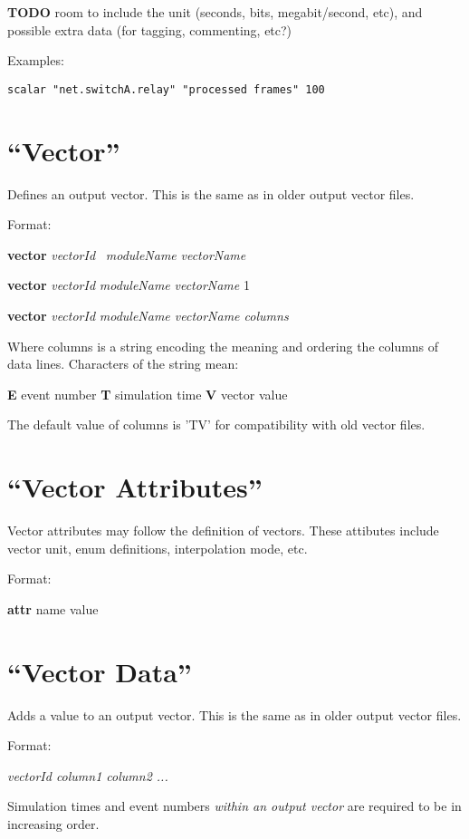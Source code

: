 \textbf{TODO} room to include the unit (seconds, bits, megabit/second,
etc), and possible extra data (for tagging, commenting, etc?)

Examples:

\begin{verbatim}
scalar "net.switchA.relay" "processed frames" 100
\end{verbatim}

\section{``Vector''}

Defines an output vector. This is the same as in older output vector
files.

Format:

\textbf{vector} \textit{vectorId} \ \textit{moduleName} \textit{vectorName}

\textbf{vector} \textit{vectorId} \textit{moduleName} \textit{vectorName} 1

\textbf{vector }\textit{vectorId} \textit{moduleName vectorName columns}

Where columns is a string encoding the meaning and ordering
the columns of data lines. Characters of the string mean:

  \textbf{E} event number
  \textbf{T} simulation time
  \textbf{V} vector value

The default value of columns is 'TV'
for compatibility with old vector files.


\section{``Vector Attributes''}

Vector attributes may follow the definition of vectors. These attibutes
include vector unit, enum definitions, interpolation mode, etc.

Format:

\textbf{attr} name value


\section{``Vector Data''}

Adds a value to an output vector. This is the same as in older output
vector files.

Format:

{\itshape vectorId column1 column2 ...}

Simulation times and event numbers \textit{within an output vector} are
required to be in increasing order.

